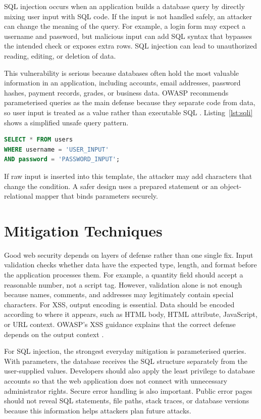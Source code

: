 \documentclass[12pt,a4paper]{article}
\begin{document}
SQL injection occurs when an application builds a database query by directly mixing user input with SQL code. If the input is not handled safely, an attacker can change the meaning of the query. For example, a login form may expect a username and password, but malicious input can add SQL syntax that bypasses the intended check or exposes extra rows. SQL injection can lead to unauthorized reading, editing, or deletion of data.

This vulnerability is serious because databases often hold the most valuable information in an application, including accounts, email addresses, password hashes, payment records, grades, or business data. OWASP recommends parameterised queries as the main defense because they separate code from data, so user input is treated as a value rather than executable SQL \cite{owaspSQLi}. Listing~\ref{lst:sqli} shows a simplified unsafe query pattern.

\begin{lstlisting}[language=SQL, caption={Unsafe SQL query built from user input.}, label={lst:sqli}]
SELECT * FROM users
WHERE username = 'USER_INPUT'
AND password = 'PASSWORD_INPUT';
\end{lstlisting}

If raw input is inserted into this template, the attacker may add characters that change the condition. A safer design uses a prepared statement or an object-relational mapper that binds parameters securely.

\section{Mitigation Techniques}
\label{sec:mitigation}

Good web security depends on layers of defense rather than one single fix. Input validation checks whether data have the expected type, length, and format before the application processes them. For example, a quantity field should accept a reasonable number, not a script tag. However, validation alone is not enough because names, comments, and addresses may legitimately contain special characters. For XSS, output encoding is essential. Data should be encoded according to where it appears, such as HTML body, HTML attribute, JavaScript, or URL context. OWASP's XSS guidance explains that the correct defense depends on the output context \cite{owaspXSS}.

For SQL injection, the strongest everyday mitigation is parameterised queries. With parameters, the database receives the SQL structure separately from the user-supplied values. Developers should also apply the least privilege to database accounts so that the web application does not connect with unnecessary administrator rights. Secure error handling is also important. Public error pages should not reveal SQL statements, file paths, stack traces, or database versions because this information helps attackers plan future attacks.
\end{document}
